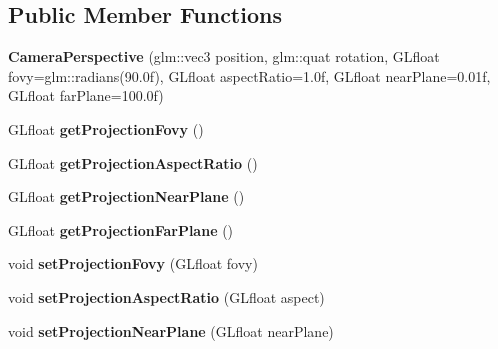 \subsection*{Public Member Functions}
\begin{DoxyCompactItemize}
\item 
{\bfseries Camera\+Perspective} (glm\+::vec3 position, glm\+::quat rotation, G\+Lfloat fovy=glm\+::radians(90.\+0f), G\+Lfloat aspect\+Ratio=1.\+0f, G\+Lfloat near\+Plane=0.\+01f, G\+Lfloat far\+Plane=100.\+0f)\hypertarget{classflw_1_1flf_1_1CameraPerspective_a379b92a93d9f8466d1d3e79a90465fa7}{}\label{classflw_1_1flf_1_1CameraPerspective_a379b92a93d9f8466d1d3e79a90465fa7}

\item 
G\+Lfloat {\bfseries get\+Projection\+Fovy} ()\hypertarget{classflw_1_1flf_1_1CameraPerspective_a0d38106602938a2b5b03a6db214ebcc0}{}\label{classflw_1_1flf_1_1CameraPerspective_a0d38106602938a2b5b03a6db214ebcc0}

\item 
G\+Lfloat {\bfseries get\+Projection\+Aspect\+Ratio} ()\hypertarget{classflw_1_1flf_1_1CameraPerspective_af49555679eb7d5a063643e30461d77ea}{}\label{classflw_1_1flf_1_1CameraPerspective_af49555679eb7d5a063643e30461d77ea}

\item 
G\+Lfloat {\bfseries get\+Projection\+Near\+Plane} ()\hypertarget{classflw_1_1flf_1_1CameraPerspective_ada21a63b8ead93a93e3de416036d08b8}{}\label{classflw_1_1flf_1_1CameraPerspective_ada21a63b8ead93a93e3de416036d08b8}

\item 
G\+Lfloat {\bfseries get\+Projection\+Far\+Plane} ()\hypertarget{classflw_1_1flf_1_1CameraPerspective_a0b19db2aaa3b7bb44bfe0b204ef341f9}{}\label{classflw_1_1flf_1_1CameraPerspective_a0b19db2aaa3b7bb44bfe0b204ef341f9}

\item 
void {\bfseries set\+Projection\+Fovy} (G\+Lfloat fovy)\hypertarget{classflw_1_1flf_1_1CameraPerspective_a68c18d3c8ccd52fc48db96973e45b525}{}\label{classflw_1_1flf_1_1CameraPerspective_a68c18d3c8ccd52fc48db96973e45b525}

\item 
void {\bfseries set\+Projection\+Aspect\+Ratio} (G\+Lfloat aspect)\hypertarget{classflw_1_1flf_1_1CameraPerspective_a19b54c2d676effb8e7b1986e4ddd5d7c}{}\label{classflw_1_1flf_1_1CameraPerspective_a19b54c2d676effb8e7b1986e4ddd5d7c}

\item 
void {\bfseries set\+Projection\+Near\+Plane} (G\+Lfloat near\+Plane)\hypertarget{classflw_1_1flf_1_1CameraPerspective_a7e7d41e82ede68c179646ab96ae93c1c}{}\label{classflw_1_1flf_1_1CameraPerspective_a7e7d41e82ede68c179646ab96ae93c1c}


\end{DoxyCompactItemize}
